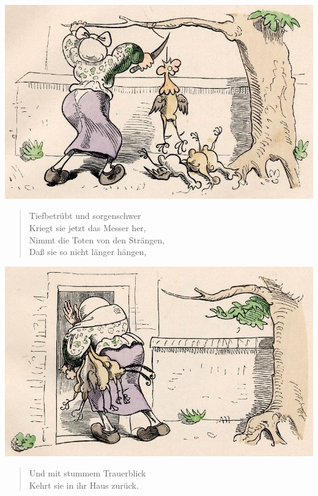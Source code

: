 \documentclass[a4paper,12pt]{article}
\begin{document}
\begin{center}\includegraphics[scale=.7, alt={nimmt die Toten ab}]{images/1-14.jpg}\end{center}



\begin{verse}
Tiefbetrübt und sorgenschwer\\{}
Kriegt sie jetzt das Messer her,\\{}
Nimmt die Toten von den Strängen,\\{}
Daß sie so nicht länger hängen,
\end{verse}



\begin{center}\includegraphics[scale=.7, alt={und kehrt zurück}]{images/1-15.jpg}\end{center}



\begin{verse}
Und mit stummem Trauerblick\\{}
Kehrt sie in ihr Haus zurück.
\end{verse}
\end{document}
